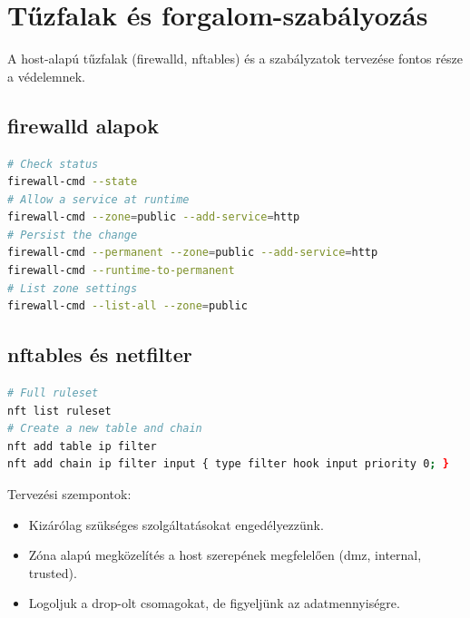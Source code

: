 \section{Tűzfalak és forgalom-szabályozás}

A host-alapú tűzfalak (firewalld, nftables) és a szabályzatok tervezése fontos része a védelemnek.

\subsection{firewalld alapok}
\begin{lstlisting}[language=bash]
# Check status
firewall-cmd --state
# Allow a service at runtime
firewall-cmd --zone=public --add-service=http
# Persist the change
firewall-cmd --permanent --zone=public --add-service=http
firewall-cmd --runtime-to-permanent
# List zone settings
firewall-cmd --list-all --zone=public
\end{lstlisting}

\subsection{nftables és netfilter}
\begin{lstlisting}[language=bash]
# Full ruleset
nft list ruleset
# Create a new table and chain
nft add table ip filter
nft add chain ip filter input { type filter hook input priority 0; }
\end{lstlisting}

Tervezési szempontok:
\begin{itemize}
  \item Kizárólag szükséges szolgáltatásokat engedélyezzünk.
  \item Zóna alapú megközelítés a host szerepének megfelelően (dmz, internal, trusted).
  \item Logoljuk a drop-olt csomagokat, de figyeljünk az adatmennyiségre.
\end{itemize}
